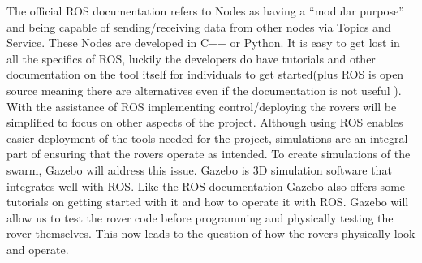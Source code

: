 \documentclass[conference]{IEEEtran}
\begin{document}
The official ROS documentation refers to Nodes as having a “modular purpose” \cite{RN202} and being capable of sending/receiving data from other nodes via Topics and Service. These Nodes are developed in C++ or Python. It is easy to get lost in all the specifics of ROS, luckily the developers do have tutorials and other documentation on the tool itself for individuals to get started(plus ROS is open source meaning there are alternatives even if the documentation is not useful \cite{RN200}). With the assistance of ROS implementing control/deploying the rovers will be simplified to focus on other aspects of the project. 
Although using ROS enables easier deployment of the tools needed for the project, simulations are an integral part of ensuring that the rovers operate as intended. To create simulations of the swarm, Gazebo will address this issue. Gazebo is 3D simulation software that integrates well with ROS\cite{RN202}. Like the ROS documentation Gazebo also offers some tutorials on getting started with it and how to operate it with ROS. Gazebo will allow us to test the rover code before programming and physically testing the rover themselves. This now leads to the question of how the rovers physically look and operate.
\end{document}
